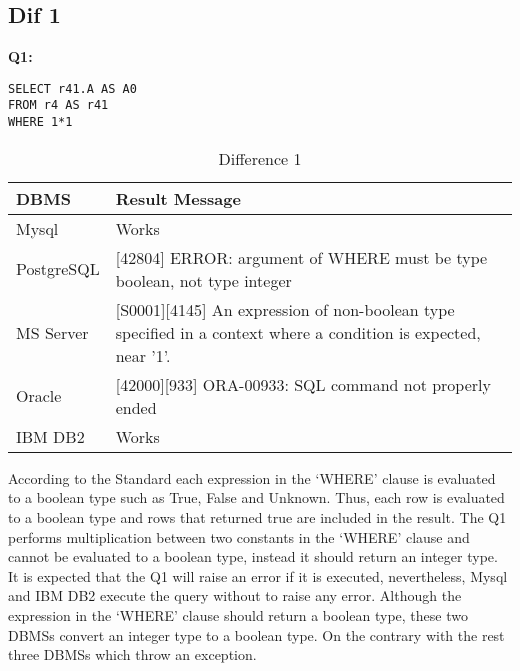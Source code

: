 \subsection{Dif 1}

\textbf{Q1:}
\begin{mdframed}[nobreak=true, backgroundcolor=lightgray!20] 
\begin{lstlisting}[style=SQL]
SELECT r41.A AS A0
FROM r4 AS r41
WHERE 1*1
\end{lstlisting}
\end{mdframed}

\begin{table}[h]
\centering
\caption{Difference 1}
\begin{tabular}{|p{2cm}|p{11.5cm}| }
\hline
\textbf{DBMS} & \textbf{Result Message}                                                                                                 \\ \hline
Mysql         & Works                                                                                                                   \\ \hline
PostgreSQL    & {[}42804{]} ERROR: argument of WHERE must be type boolean, not type integer                                             \\ \hline
MS Server     & {[}S0001{]}{[}4145{]} An expression of non-boolean type specified in a context where a condition is expected, near '1'. \\ \hline
Oracle        & {[}42000{]}{[}933{]} ORA-00933: SQL command not properly ended                                                          \\ \hline
IBM DB2       & Works                                                                                                                   \\ \hline
\end{tabular}
\end{table}

According to the Standard each expression in the ‘WHERE’ clause is evaluated to a boolean type such as True, False and Unknown. Thus, each row is evaluated to a boolean type and rows that returned true are included in the result. The Q1 performs multiplication between two constants in the ‘WHERE’ clause and cannot be evaluated to a boolean type, instead it should return an integer type. It is expected that the Q1 will raise an error if it is executed, nevertheless, Mysql and IBM DB2 execute the query without to raise any error. Although the expression in the ‘WHERE’ clause should return a boolean type, these two DBMSs convert an integer type to a boolean type. On the contrary with the rest three DBMSs which throw an exception.  

